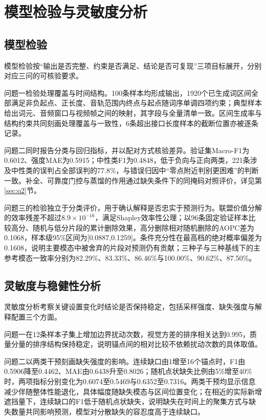 \section{模型检验与灵敏度分析}
\subsection{模型检验}
模型检验按“输出是否完整、约束是否满足、结论是否可复现”三项目标展开，分别对应三问的可核验要求。

问题一检验处理覆盖与时间结构。100条样本均形成输出，1920个已生成词区间全部满足非负起点、正长度、音轨范围内终点与起点随词序单调四项约束；典型样本给出词元、音频窗口与视频帧之间的映射，其字段与全量清单一致。区间生成率与结构约束共同刻画处理覆盖与一致性，6条超出接口长度样本的截断位置亦被逐条记录。

问题二同时报告分类与回归指标，并以配对方式核验差异。验证集Macro-F1为0.6012、强度MAE为0.5915；中性类F1为0.4848，低于负向与正向两类，221条涉及中性类的误判占全部误判的77.8\%，与错误归因中“零点附近判别更困难”的判断一致。补全、可靠度门控与蒸馏的作用通过缺失条件下的同掩码对照评价，详见第\ref{sec:q2}节。

问题三的检验独立于分类评价，用于确认解释是否忠实于预测行为。联盟价值分解的效率残差不超过$8.9\times10^{-16}$，满足Shapley效率性公理；以96条固定验证样本比较高分、随机与低分片段的累计删除效果，高分删除相对随机删除的AOPC差为0.1068，样本级95\%区间为[0.0887,0.1259]。条件充分性在最高档的绝对概率偏差为0.1608，说明主要模态中被舍弃的片段对预测仍有贡献；三种子与三种基线下的主参考模态一致率分别为82.29\%、83.33\%、86.46\%与100.00\%、90.62\%、87.50\%。

\subsection{灵敏度与稳健性分析}
灵敏度分析考察关键设置变化时结论是否保持稳定，包括采样强度、缺失强度与解释配置三个方面。

问题一在12条样本子集上增加边界扰动次数，视觉方差的排序相关达到0.995，质量分量的排序结构保持稳定，说明锚点间的相对比较不依赖扰动次数的具体取值。

问题二以两类干预刻画缺失强度的影响。连续缺口由1增至16个锚点时，F1由0.5906降至0.4462、MAE由0.6438升至0.8026；随机点状缺失比例由5\%增至40\%时，两项指标分别变化为0.6074至0.5469与0.6352至0.7316。两类干预均显示信息减少伴随整体性能退化，具体幅度随缺失模态与区间位置变化；在相近的实际新增遮挡量下，连续缺口的F1低于随机点状缺失，说明缺失在时间上的聚集方式与缺失数量共同影响预测，模型对分散缺失的容忍度高于连续缺口。

